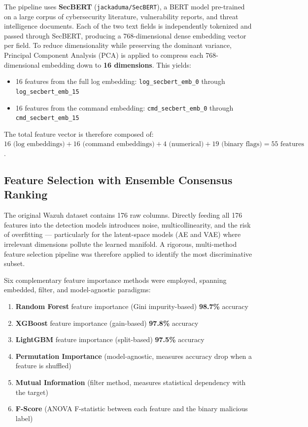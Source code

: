 The pipeline uses \textbf{SecBERT} (\texttt{jackaduma/SecBERT}), a BERT model pre-trained on a large corpus of cybersecurity literature, vulnerability reports, and threat intelligence documents. Each of the two text fields is independently tokenized and passed through SecBERT, producing a 768-dimensional dense embedding vector per field. To reduce dimensionality while preserving the dominant variance, Principal Component Analysis (PCA) is applied to compress each 768-dimensional embedding down to \textbf{16 dimensions}. This yields:
\begin{itemize}
    \item 16 features from the full log embedding: \texttt{log\_secbert\_emb\_0} through \texttt{log\_secbert\_emb\_15}
    \item 16 features from the command embedding: \texttt{cmd\_secbert\_emb\_0} through \texttt{cmd\_secbert\_emb\_15}
\end{itemize}

The total feature vector is therefore composed of: $16 \text{ (log embeddings)} + 16 \text{ (command embeddings)} + 4 \text{ (numerical)} + 19 \text{ (binary flags)} = 55 \text{ features}$.

\subsection{Feature Selection with Ensemble Consensus Ranking}
\label{subsec:feature_selection}

The original Wazuh dataset contains 176 raw columns. Directly feeding all 176 features into the detection models introduces noise, multicollinearity, and the risk of overfitting --- particularly for the latent-space models (AE and VAE) where irrelevant dimensions pollute the learned manifold. A rigorous, multi-method feature selection pipeline was therefore applied to identify the most discriminative subset.

Six complementary feature importance methods were employed, spanning embedded, filter, and model-agnostic paradigms:
\begin{enumerate}
    \item \textbf{Random Forest} feature importance (Gini impurity-based) \textbf{98.7\% } accuracy
    \item \textbf{XGBoost} feature importance (gain-based) \textbf{97.8\%} accuracy
    \item \textbf{LightGBM} feature importance (split-based) \textbf{97.5\%} accuracy
    \item \textbf{Permutation Importance} (model-agnostic, measures accuracy drop when a feature is shuffled)
    \item \textbf{Mutual Information} (filter method, measures statistical dependency with the target)
    \item \textbf{F-Score} (ANOVA F-statistic between each feature and the binary malicious label)
\end{enumerate}

